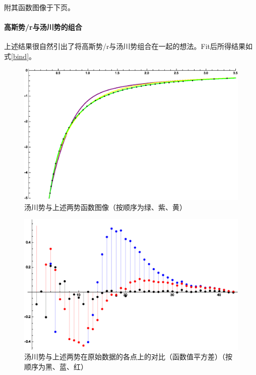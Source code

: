 \documentclass[hyperref,cs4size,titlepage,twoside]{ctexart}
\begin{document}
附其函数图像于下页。
\paragraph{高斯势/r与汤川势的组合}
上述结果很自然引出了将高斯势/r与汤川势组合在一起的想法。Fit后所得结果如式\eqref{bind}。

\begin{figure}[!htbp]
  \centering
  \includegraphics[width=5.2in]{Test_BindingEnergy_FitOtherwise.eps}
  \caption{汤川势与上述两势函数图像（按顺序为绿、紫、黄）}
\end{figure}

\begin{figure}[!htbp]
  \centering
  \includegraphics[width=5.2in]{Test_BindingEnergy_FitOtherwise1.eps}
  \caption{汤川势与上述两势在原始数据的各点上的对比（函数值平方差）（按顺序为黑、蓝、红）}
\end{figure}
\end{document}
